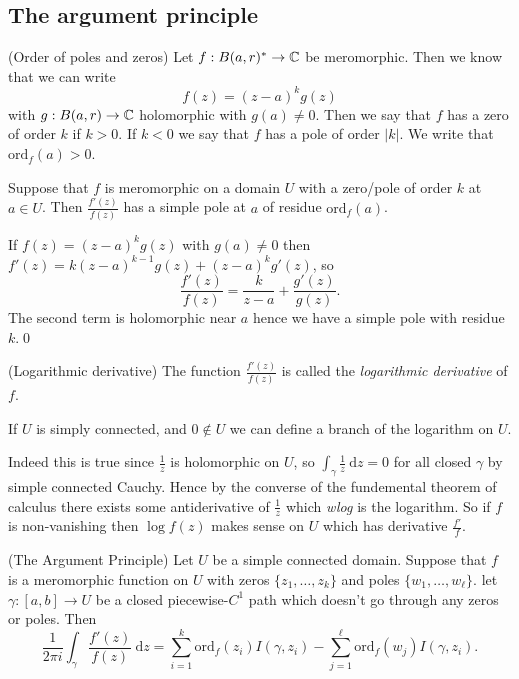 \documentclass{article}
\begin{document}
\subsection{The argument principle}
\begin{definition} (Order of poles and zeros) Let $ f:B(a,r)^*\to \mathbb{C} $ be meromorphic. Then we know that we can write
	\[
	  f(z) = (z-a)^kg(z)
	\]
	with $ g:B(a,r) \to \mathbb{C} $ holomorphic with $ g(a)\ne 0 $. Then we say that $ f $ has a zero of order $ k $ if $ k>0 $. If $ k<0 $ we say that $ f $ has a pole of order $ |k| $. We write that $ \mathrm{ord}_f(a)>0 $.
\end{definition}
\begin{lemma}
	Suppose that $ f $ is meromorphic on a domain $ U $ with a zero/pole of order $ k $ at $ a\in U $. Then $ \frac{f'(z)}{f(z)} $ has a simple pole at $ a $ of residue $ \mathrm{ord}_f(a) $. 
\end{lemma}
\pf If $ f(z) = (z-a)^kg(z) $ with $ g(a)\ne 0 $ then $ f'(z) = k(z-a)^{k-1}g(z) + (z-a)^kg'(z) $, so
\[
	\frac{f'(z)}{f(z)} = \frac k{z-a} + \frac{g'(z)}{g(z)}.
\]
The second term is holomorphic near $ a $ hence we have a simple pole with residue $ k $.\qed
\begin{definition}
	(Logarithmic derivative) The function $ \frac{f'(z)}{f(z)} $ is called the \textit{logarithmic derivative} of $ f $.
\end{definition}
\begin{remark}
  If $ U $ is simply connected, and $ 0\notin U $ we can define a branch of the logarithm on $ U $.\par
  Indeed this is true since $ \frac 1z $ is holomorphic on $ U $, so $ \int_\gamma \frac 1z \ \mathrm dz =0 $ for all closed $ \gamma $ by simple connected Cauchy. Hence by the converse of the fundemental theorem of calculus there exists some antiderivative of $ \frac 1z $ which \textit{wlog} is the logarithm. So if $ f $ is non-vanishing then $ \log f(z) $ makes sense on $ U $ which has derivative $ \frac {f'}f $.
\end{remark}
\begin{theorem}
	(The Argument Principle) Let $ U $ be a simple connected domain. Suppose that $ f $ is a meromorphic function on $ U $ with zeros $ \{z_1,\dots, z_k\} $ and poles $ \{w_1,\dots, w_\ell\} $. let $ \gamma:[a,b]\to U $ be a closed piecewise-$ C^1 $ path which doesn't go through any zeros or poles. Then 
	\[
		\frac1{2\pi i}\int_\gamma \frac{f'(z)}{f(z)} \ \mathrm dz = \sum_{i=1}^k \mathrm{ord}_f(z_i)I(\gamma, z_i) - \sum_{j=1}^\ell \mathrm{ord}_f(w_j)I(\gamma, z_i).
	\]
\end{theorem}
\end{document}
